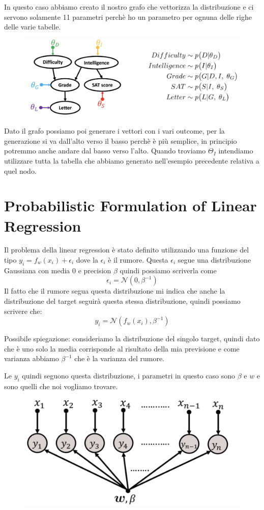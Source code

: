 \documentclass[14pt]{extreport}
\begin{document}
In questo caso abbiamo creato il nostro grafo che vettorizza la distribuzione e ci servono solamente 11 parametri perchè ho un parametro per ognuna
delle righe delle varie tabelle.

\begin{figure}[H]
	\centering
	\includegraphics[width=0.7\linewidth]{103.jpeg}
\end{figure}

Dato il grafo possiamo poi generare i vettori con i vari outcome, per la generazione si va dall'alto verso il basso perchè è più semplice, in
principio potremmo anche andare dal basso verso l'alto. Quando troviamo $\Theta_I$ intendiamo utilizzare tutta la tabella che abbiamo generato
nell'esempio precedente relativa a quel nodo.

\section{Probabilistic Formulation of Linear Regression}

Il problema della linear regression è stato definito utilizzando una funzione del tipo $y_i = f_w(x_i) + \epsilon_i$ dove la $\epsilon_i$ è il rumore.
Questa $\epsilon_i$ segue una distribuzione Gaussiana con media 0 e precision $\beta$ quindi possiamo scriverla come $$\epsilon_i
=\mathcal{N}(0,\beta^{-1})$$ Il fatto che il rumore segua questa distribuzione mi indica che anche la distribuzione del target seguirà questa stessa
distribuzione, quindi possiamo scrivere che: $$y_i = \mathcal{N}(f_w(x_i), \beta^{-1})$$

Possibile spiegazione: consideriamo la distribuzione del singolo target, quindi dato che è uno solo la media corrisponde al risultato della mia
previsione e come varianza abbiamo $\beta^{-1}$ che è la varianza del rumore.

Le $y_i$ quindi seguono questa distribuzione, i parametri in questo caso sono $\beta$ e $w$ e sono quelli che noi vogliamo trovare.

\begin{figure}[H]
	\centering
	\includegraphics[width=0.5\linewidth]{104.jpeg}
\end{figure}
\end{document}
